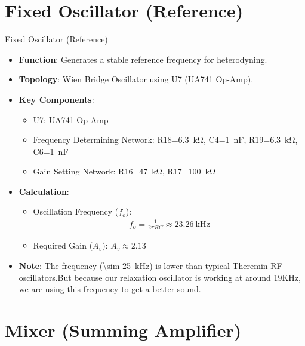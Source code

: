 \documentclass[10pt,xcolor={table,dvipsnames},t]{beamer}
\begin{document}
\section{Fixed Oscillator (Reference)}

\begin{frame}{Fixed Oscillator (Reference)}
\begin{itemize}
    \item \textbf{Function}: Generates a stable reference frequency for heterodyning.
    \item \textbf{Topology}: Wien Bridge Oscillator using U7 (UA741 Op-Amp).
    \item \textbf{Key Components}:
    \begin{itemize}
        \item U7: UA741 Op-Amp
        \item Frequency Determining Network: R18=\SI{6.3}{\kilo\ohm}, C4=\SI{1}{\nano\farad}, R19=\SI{6.3}{\kilo\ohm}, C6=\SI{1}{\nano\farad}
        \item Gain Setting Network: R16=\SI{47}{\kilo\ohm}, R17=\SI{100}{\kilo\ohm}
    \end{itemize}
    \item \textbf{Calculation}:
    \begin{itemize}
        \item Oscillation Frequency ($f_o$):
        \begin{align*}
        f_o = \frac{1}{2\pi RC} \approx \SI{23.26}{\kilo\hertz}
        \end{align*}
        \item Required Gain ($A_v$): $A_v \approx 2.13$
    \end{itemize}
     \item \textbf{Note}: The frequency (\SI{\sim 25}{\kilo\hertz}) is lower than typical Theremin RF oscillators.But because our relaxation oscillator is working at around 19KHz, we are using this frequency to get a better sound.
\end{itemize}
\end{frame}

\section{Mixer (Summing Amplifier)}
\end{document}
